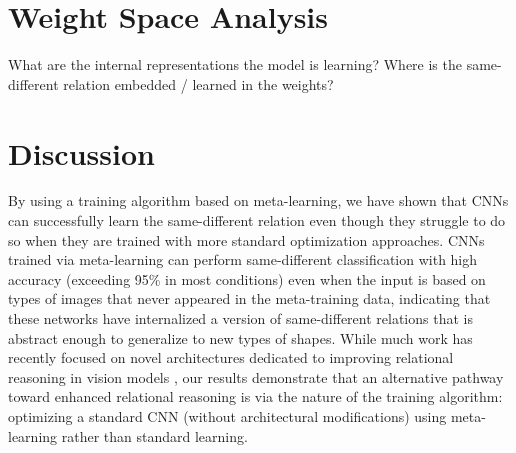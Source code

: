 \documentclass[10pt,letterpaper]{article}
\begin{document}
\section{Weight Space Analysis}

What are the internal representations the model is learning? Where is the same-different relation embedded / learned in the weights? 

\section{Discussion}

By using a training algorithm based on meta-learning, we have shown that CNNs can successfully learn the same-different relation even though they struggle to do so when they are trained with more standard optimization approaches.
CNNs trained via meta-learning can perform same-different classification with high accuracy (exceeding 95\% in most conditions) even when the input is based on types of images that never appeared in the meta-training data, indicating that these networks have internalized a version of same-different relations that is abstract enough to generalize to new types of shapes.
While much work has recently focused on novel  architectures dedicated to improving relational reasoning in vision models \cite{webb2021emergent,kerg2022inductive,altabaa2024abstractors,webb2024relational}, our results demonstrate that an alternative pathway toward enhanced relational reasoning is via the nature of the training algorithm: optimizing a standard CNN (without architectural modifications) using meta-learning rather than standard learning. 
\end{document}
